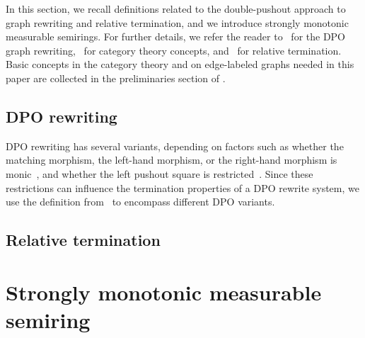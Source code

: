   
In this section, we recall definitions related to the double-pushout approach to graph rewriting and relative termination, and we introduce strongly monotonic measurable semirings. For further details, we refer the reader to~\cite{konig2018atutorial,corradini1997algebraic,habel2001double} for the DPO graph rewriting,~\cite{pierce1991basic, barr1990category} for category theory concepts, and~\cite{geser1990relative} for relative termination. Basic concepts in the category theory and on edge-labeled graphs needed in this paper are collected in the preliminaries section of \cite{qiu2025termination}.

\subsection{DPO rewriting}
\label{preliminaries:grs}


DPO rewriting has several variants, depending on factors such as whether the matching morphism, the left-hand morphism, or the right-hand morphism is monic~\cite{habel2001double}, and whether the left pushout square is restricted~\cite{behr2021concurrency,behr2023fundamentals}. Since these restrictions can influence the termination properties of a DPO rewrite system,  we use the definition from~\cite{endrullis2024generalized_arxiv_v2} to encompass different DPO variants.

\subsection{Relative termination}
  \label{preliminaries:relative_termination}


 
\section{Strongly monotonic measurable semiring}
\label{sec:strongly_monotonic_measurable_semiring}
